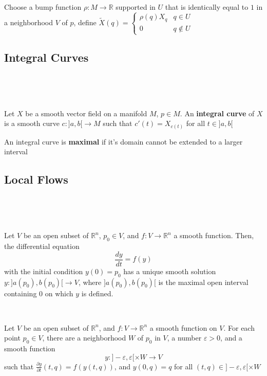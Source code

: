 \documentclass{article}
\begin{document}
\begin{customproof}
  \

  Choose a bump function $\rho: M \to \mathbb{R}$ supported in $U$ that is identically equal to $1$ in a neighborhood $V$ of $p$, define $\tilde{X}(q) =
  \begin{cases}
    \rho(q)X_q & q \in U\\
    0 & q \notin U
  \end{cases}$
\end{customproof}

\subsection{Integral Curves}
\

\begin{definition}
  \

Let $X$ be a smooth vector field on a manifold $M$, $p \in M$. An \textbf{integral curve} of $X$ is a smooth curve $c: ]a,b[ \to M$ such that $c'(t) = X_{c(t)}$ for all $t \in ]a,b[$

  An integral curve is \textbf{maximal} if it's domain cannot be extended to a larger interval
\end{definition}

\subsection{Local Flows}
\

\begin{theorem}
  \

Let $V$ be an open subset of $\mathbb{R}^n$, $p_0 \in V$, and $f: V \to \mathbb{R}^n$ a smooth function. Then, the differential equation $$\frac{dy}{dt} = f(y)$$with the initial condition $y(0) = p_0$ has a unique smooth solution $y: ]a(p_0), b(p_0)[ \to V$, where $]a(p_0), b(p_0)[$ is the maximal open interval containing $0$ on which $y$ is defined.
\end{theorem}

\begin{theorem}
  \

Let $V$ be an open subset of $\mathbb{R}^n$, and $f: V\to \mathbb{R}^n$ a smooth function on $V$. For each point $p_0 \in V$, there are a neighborhood $W$ of $p_0$ in $V$, a number $\varepsilon > 0$, and a smooth function $$y: ]-\varepsilon, \varepsilon[ \times W \to V$$such that $\frac{\partial y}{\partial t}(t,q) = f(y(t,q))$, and $y(0,q) = q$ for all $(t,q) \in ]-\varepsilon, \varepsilon[ \times W$
\end{theorem}
\end{document}
